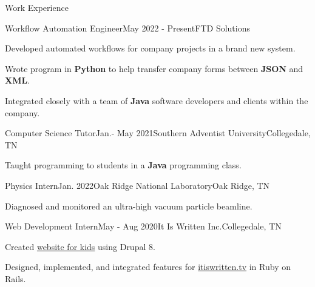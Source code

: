 \begin{rSection}{Work Experience}
	\begin{job}{Workflow Automation Engineer}{May 2022 - Present}{FTD Solutions}{}
		\item Developed automated workflows for company projects in a brand new system.
		\item Wrote program in {\bf Python} to help transfer company forms between {\bf JSON} and {\bf XML}.
		\item Integrated closely with a team of {\bf Java} software developers and clients within the company.
	\end{job}
	
	\begin{job}{Computer Science Tutor}{Jan.- May 2021}{Southern Adventist University}{Collegedale, TN}
	 \item Taught programming to students in a {\bf Java} programming class.
	\end{job}

	\begin{job}{Physics Intern}{Jan. 2022}{Oak Ridge National Laboratory}{Oak Ridge, TN}
	 \item Diagnosed and monitored an ultra-high vacuum particle beamline.
	\end{job}

	\begin{job}{Web Development Intern}{May - Aug 2020}{It Is Written Inc.}{Collegedale, TN}
		\item Created \href{https://buriedtreasure.fun/}{website for kids} using Drupal 8.
		\item Designed, implemented, and integrated features for \href{https://itiswritten.tv}{itiswritten.tv} in Ruby on Rails.
	\end{job}
\end{rSection}